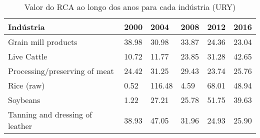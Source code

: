 \begin{table}
\centering
\caption{Valor do RCA ao longo dos anos para cada indústria (URY)}
\label{tab:ex3-tempo-URY}
\begin{tabular}{p{6cm}p{1.5cm}p{1.5cm}p{1.5cm}p{1.5cm}p{1.5cm}}
\toprule
                      Indústria &  2000 &   2004 &  2008 &  2012 &  2016 \\
\midrule
            Grain mill products & 38.98 &  30.98 & 33.87 & 24.36 & 23.04 \\
                    Live Cattle & 10.72 &  11.77 & 23.85 & 31.28 & 42.65 \\
  Processing/preserving of meat & 24.42 &  31.25 & 29.43 & 23.74 & 25.76 \\
                     Rice (raw) &  0.52 & 116.48 &  4.59 & 68.01 & 48.94 \\
                       Soybeans &  1.22 &  27.21 & 25.78 & 51.75 & 39.63 \\
Tanning and dressing of leather & 38.93 &  47.05 & 31.96 & 24.93 & 25.90 \\
\bottomrule
\end{tabular}
\end{table}
